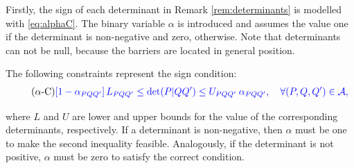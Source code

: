 \documentclass[a4paper,  review, authoryear, 1p.]{elsarticle}
\newcommand{\VB}{{V^{}_{\mathcal B}}}
\newcommand{\JP}[1]{{\color{armygreen}#1}}
\newcommand{\CV}[1]{{\color{blue}#1}}
\newcommand{\determinant}[3]{\det({#1|#2#3})}
\begin{document}
	\newcommand{\LS}[3]{L_{#1#2#3}}
	\newcommand{\US}[3]{U_{#1#2#3}}
	\newcommand{\alphamas}[3]{\alpha_{#1#2#3}}
	\newcommand{\alphamenos}[3]{\alpha^{-}(#1|#2#3)}
	\newcommand{\alphapunto}[3]{\alpha^{\cdotp}(#1|#2#3)}
	
	Firstly, the sign of each determinant in Remark \ref{rem:determinants} \JP{is modelled with \eqref{eq:alphaC}.} The binary variable $\alpha$ is introduced and assumes the value one if the determinant is non-negative and zero, otherwise. Note that determinants can not be null, because the barriers are located in general position.
	
	The following constraints represent the sign condition:
	\begin{align*}\label{eq:alphaC} \tag{$\alpha$-C}
		\CV{\left[1-\alphamas{P}{Q}{Q'}\right]\LS{P}{Q}{Q'}\leq\determinant{P}{Q}{Q'}\leq \US{P}{Q}{Q'}\:\alphamas{P}{Q}{Q'},\quad\forall (P,Q,Q') \in \mathcal A,}
	\end{align*}
	
	\noindent where $L$ and $U$ are lower and upper bounds for the value of the corresponding determinants, respectively. If a determinant is non-negative, then $\alpha$ must be one to make the second inequality feasible. Analogously, if the determinant is not positive, $\alpha$ must be zero to satisfy the correct condition.
	
	\newcommand{\deltamas}[4]{\delta_{#1#2#3#4}}
	
\end{document}
